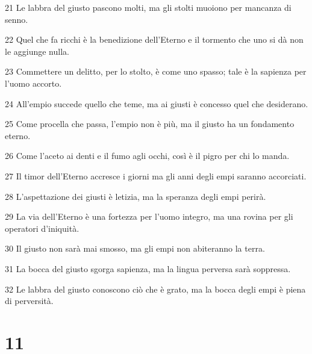 \par 21 Le labbra del giusto pascono molti, ma gli stolti muoiono per mancanza di senno.
\par 22 Quel che fa ricchi è la benedizione dell'Eterno e il tormento che uno si dà non le aggiunge nulla.
\par 23 Commettere un delitto, per lo stolto, è come uno spasso; tale è la sapienza per l'uomo accorto.
\par 24 All'empio succede quello che teme, ma ai giusti è concesso quel che desiderano.
\par 25 Come procella che passa, l'empio non è più, ma il giusto ha un fondamento eterno.
\par 26 Come l'aceto ai denti e il fumo agli occhi, così è il pigro per chi lo manda.
\par 27 Il timor dell'Eterno accresce i giorni ma gli anni degli empi saranno accorciati.
\par 28 L'aspettazione dei giusti è letizia, ma la speranza degli empi perirà.
\par 29 La via dell'Eterno è una fortezza per l'uomo integro, ma una rovina per gli operatori d'iniquità.
\par 30 Il giusto non sarà mai smosso, ma gli empi non abiteranno la terra.
\par 31 La bocca del giusto sgorga sapienza, ma la lingua perversa sarà soppressa.
\par 32 Le labbra del giusto conoscono ciò che è grato, ma la bocca degli empi è piena di perversità.

\chapter{11}

